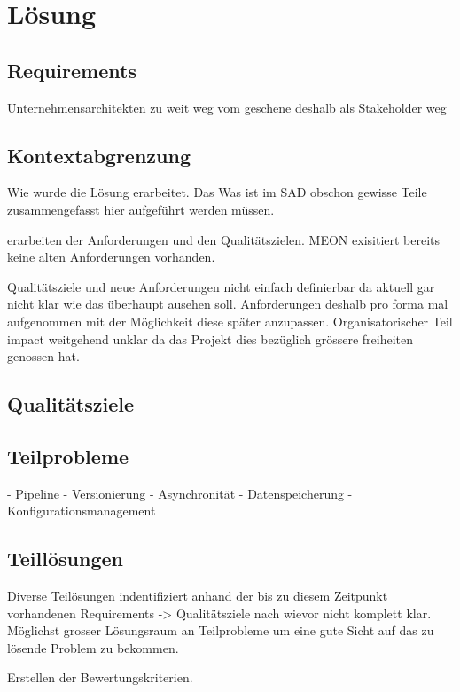 \chapter{Lösung}

\section{Requirements}

Unternehmensarchitekten zu weit weg vom geschene deshalb als Stakeholder weg

\section{Kontextabgrenzung}

Wie wurde die Lösung erarbeitet. Das Was ist im SAD obschon gewisse Teile zusammengefasst hier aufgeführt werden müssen.

erarbeiten der Anforderungen und den Qualitätszielen. MEON exisitiert bereits keine alten Anforderungen vorhanden. 

Qualitätsziele und neue Anforderungen nicht einfach definierbar da aktuell gar nicht klar wie das überhaupt ausehen soll. Anforderungen deshalb pro forma mal aufgenommen mit der Möglichkeit diese später anzupassen.
Organisatorischer Teil impact weitgehend unklar da das Projekt dies bezüglich grössere freiheiten genossen hat. 

\section{Qualitätsziele}

\section{Teilprobleme}

- Pipeline
- Versionierung
- Asynchronität
- Datenspeicherung
- Konfigurationsmanagement

\section{Teillösungen}

Diverse Teilösungen indentifiziert anhand der bis zu diesem Zeitpunkt vorhandenen Requirements -> Qualitätsziele nach wievor nicht komplett klar.
Möglichst grosser Lösungsraum an Teilprobleme um eine gute Sicht auf das zu lösende Problem zu bekommen.


Erstellen der Bewertungskriterien.

